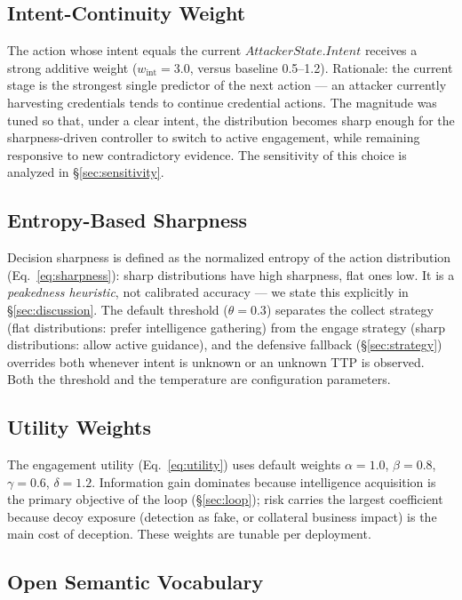\documentclass[11pt]{article}
\begin{document}
\subsection{Intent-Continuity Weight}

The action whose intent equals the current $\mathit{AttackerState.Intent}$
receives a strong additive weight ($w_{\mathrm{int}} = 3.0$, versus baseline
0.5--1.2). Rationale: the current stage is the strongest single predictor of
the next action --- an attacker currently harvesting credentials tends to
continue credential actions. The magnitude was tuned so that, under a clear
intent, the distribution becomes sharp enough for the sharpness-driven
controller to switch to active engagement, while remaining responsive to new
contradictory evidence. The sensitivity of this choice is analyzed in
\S\ref{sec:sensitivity}.

\subsection{Entropy-Based Sharpness}

Decision sharpness is defined as the normalized entropy of the action
distribution (Eq.~\ref{eq:sharpness}): sharp distributions have high
sharpness, flat ones low. It is a \textit{peakedness heuristic}, not
calibrated accuracy --- we state this explicitly in \S\ref{sec:discussion}.
The default threshold ($\theta = 0.3$) separates the collect strategy (flat
distributions: prefer intelligence gathering) from the engage strategy
(sharp distributions: allow active guidance), and the defensive fallback
(\S\ref{sec:strategy}) overrides both whenever intent is unknown or an
unknown TTP is observed. Both the threshold and the temperature are
configuration parameters.

\subsection{Utility Weights}

The engagement utility (Eq.~\ref{eq:utility}) uses default weights
$\alpha=1.0$, $\beta=0.8$, $\gamma=0.6$, $\delta=1.2$. Information gain
dominates because intelligence acquisition is the primary objective of the
loop (\S\ref{sec:loop}); risk carries the largest coefficient because decoy
exposure (detection as fake, or collateral business impact) is the main cost
of deception. These weights are tunable per deployment.

\subsection{Open Semantic Vocabulary}
\label{sec:open-vocab}
\end{document}
